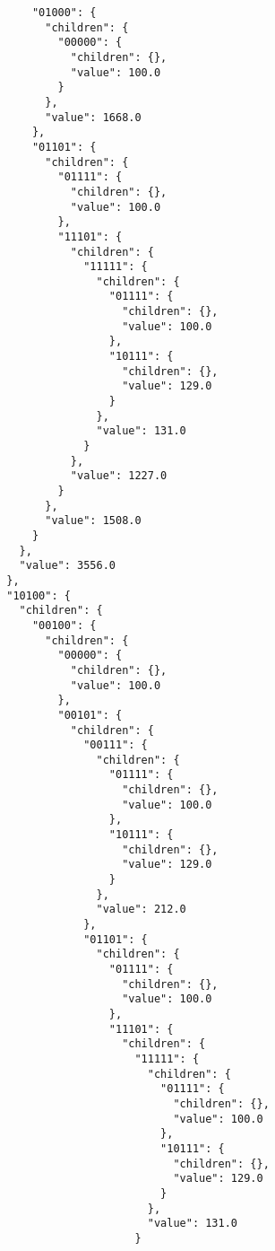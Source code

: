 \documentclass{article}
\begin{document}
\begin{listing}
\begin{verbatim}
            "01000": {
              "children": {
                "00000": {
                  "children": {},
                  "value": 100.0
                }
              },
              "value": 1668.0
            },
            "01101": {
              "children": {
                "01111": {
                  "children": {},
                  "value": 100.0
                },
                "11101": {
                  "children": {
                    "11111": {
                      "children": {
                        "01111": {
                          "children": {},
                          "value": 100.0
                        },
                        "10111": {
                          "children": {},
                          "value": 129.0
                        }
                      },
                      "value": 131.0
                    }
                  },
                  "value": 1227.0
                }
              },
              "value": 1508.0
            }
          },
          "value": 3556.0
        },
        "10100": {
          "children": {
            "00100": {
              "children": {
                "00000": {
                  "children": {},
                  "value": 100.0
                },
                "00101": {
                  "children": {
                    "00111": {
                      "children": {
                        "01111": {
                          "children": {},
                          "value": 100.0
                        },
                        "10111": {
                          "children": {},
                          "value": 129.0
                        }
                      },
                      "value": 212.0
                    },
                    "01101": {
                      "children": {
                        "01111": {
                          "children": {},
                          "value": 100.0
                        },
                        "11101": {
                          "children": {
                            "11111": {
                              "children": {
                                "01111": {
                                  "children": {},
                                  "value": 100.0
                                },
                                "10111": {
                                  "children": {},
                                  "value": 129.0
                                }
                              },
                              "value": 131.0
                            }

\end{verbatim}
\end{listing}
\end{document}

